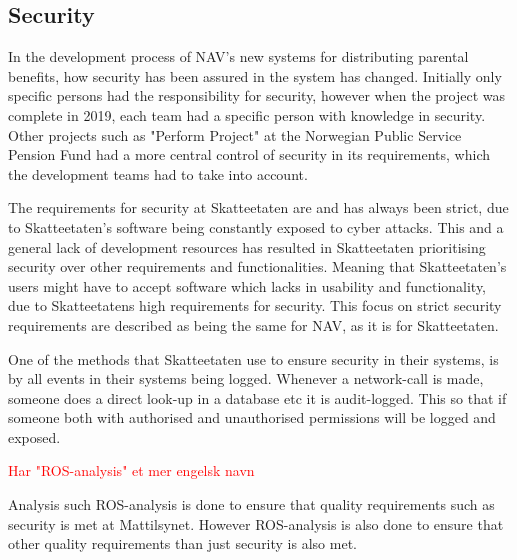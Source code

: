 \subsection{Security}
In the development process of NAV's new systems for distributing parental benefits, how security has been assured in the system has changed. Initially only specific persons had the responsibility for security, however when the project was complete in 2019, each team had a specific person with knowledge in security. Other projects such as "Perform Project" at the Norwegian Public Service Pension Fund had a more central control of security in its requirements, which the development teams had to take into account.

The requirements for security at Skatteetaten are and has always been strict, due to Skatteetaten's software  being constantly exposed to cyber attacks. This and a general lack of development resources has resulted in Skatteetaten prioritising security over other requirements and functionalities. Meaning that Skatteetaten's users might have to accept software which lacks in usability and functionality, due to Skatteetatens high requirements for security. This focus on strict security requirements are described as being the same for NAV, as it is for Skatteetaten.

One of the methods that Skatteetaten use to ensure security in their systems, is by all events in their systems being logged. Whenever a network-call is made, someone does a direct look-up in a database etc it is audit-logged. This so that if someone both with authorised and unauthorised permissions will be logged and exposed.

\textcolor{red}{Har "ROS-analysis" et mer engelsk navn}

Analysis such ROS-analysis is done to ensure that quality requirements such as security is met at Mattilsynet. However ROS-analysis is also done to ensure that other quality requirements than just security is also met.


